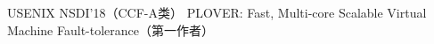 \cvpub
{USENIX NSDI'18（CCF-A类）} %
{PLOVER: Fast, Multi-core Scalable Virtual Machine Fault-tolerance（第一作者）} %
{} %
{} %
{ %
}

